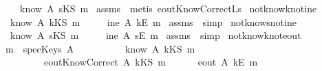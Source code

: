 \begin{isabellebody}
\ \ \ \ {\isachardoublequoteopen}know\ A\ {\isacharparenleft}sKS\ m{\isacharparenright}{\isachardoublequoteclose}\isanewline
\isadelimproof
\endisadelimproof
\isatagproof
{}\isamarkupfalse \ assms\ \isamarkupfalse \ {\isacharparenleft}metis\ eoutKnowCorrect{\isacharunderscore}L{}s{\isacharparenright}\endisatagproof
{\isafoldproof}\isadelimproof
\isanewline
\endisadelimproof
\isanewline
{}\isamarkupfalse \ not{\isacharunderscore}know{\isacharunderscore}k{\isacharunderscore}not{\isacharunderscore}ine{\isacharcolon}\isanewline
{}\ {\isachardoublequoteopen}{\isasymnot}\ know\ A\ {\isacharparenleft}kKS\ m{\isacharparenright}{\isachardoublequoteclose}\isanewline
{}\ \ \ \ {\isachardoublequoteopen}{\isasymnot}\ ine\ A\ {\isacharparenleft}kE\ m{\isacharparenright}{\isachardoublequoteclose}\isanewline
\isadelimproof
\endisadelimproof
\isatagproof
{}\isamarkupfalse \ assms\ \isamarkupfalse \ simp\endisatagproof
{\isafoldproof}\isadelimproof
\isanewline
\endisadelimproof
\isanewline
{}\isamarkupfalse \ not{\isacharunderscore}know{\isacharunderscore}s{\isacharunderscore}not{\isacharunderscore}ine{\isacharcolon}\isanewline
{}\ {\isachardoublequoteopen}{\isasymnot}\ know\ A\ {\isacharparenleft}sKS\ m{\isacharparenright}{\isachardoublequoteclose}\isanewline
{}\ \ \ \ {\isachardoublequoteopen}{\isasymnot}\ ine\ A\ {\isacharparenleft}sE\ m{\isacharparenright}{\isachardoublequoteclose}\isanewline
\isadelimproof
\endisadelimproof
\isatagproof
{}\isamarkupfalse \ assms\ \isamarkupfalse \ simp\endisatagproof
{\isafoldproof}\isadelimproof
\isanewline
\endisadelimproof
\isanewline
{}\isamarkupfalse \ not{\isacharunderscore}know{\isacharunderscore}k{\isacharunderscore}not{\isacharunderscore}eout{\isacharcolon}\isanewline
{}\ {\isachardoublequoteopen}m\ {\isasymnotin}\ specKeys\ A{\isachardoublequoteclose}\isanewline
\ \ \ \ \ \ \ \ \ {\isachardoublequoteopen}{\isasymnot}\ know\ A\ {\isacharparenleft}kKS\ m{\isacharparenright}{\isachardoublequoteclose}\ \isanewline
\ \ \ \ \ \ \ \ \ {\isachardoublequoteopen}eoutKnowCorrect\ A\ {\isacharparenleft}kKS\ m{\isacharparenright}{\isachardoublequoteclose}\isanewline
{}\ \ \ \ \ {\isachardoublequoteopen}{\isasymnot}\ eout\ A\ {\isacharparenleft}kE\ m{\isacharparenright}{\isachardoublequoteclose}\isanewline
\isadelimproof
\endisadelimproof

\end{isabellebody}
